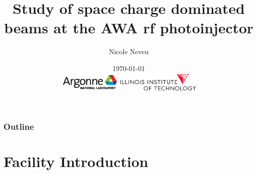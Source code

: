 \documentclass[professionalfonts]{beamer}
\title[Space Charge 2017]{Study of space charge dominated beams at the AWA rf photoinjector}
\author[N.Neveu]{{\Large Nicole Neveu}}
\institute[ANL, IIT] %
{   Illinois Institute of Technology \\
	Argonne National Laboratory \\
    \url{nneveu@anl.gov} 
}
\date{ \today \\
\includegraphics[width=3cm,keepaspectratio]{../images/Argonne_cmyk_black}%
\hfill \hfill \hfill%
\includegraphics[width=4cm,keepaspectratio]{../images/IIT_logo}%
}
\begin{document}
\begin{frame}
  \titlepage
\end{frame}
\begin{frame}
	\frametitle{Outline}
	\tableofcontents
\end{frame}






\section{Facility Introduction}
\end{document}
